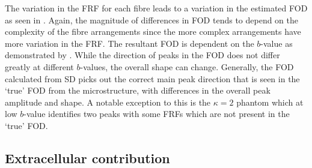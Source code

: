 The variation in the \ac{FRF} for each fibre leads to a variation in the estimated \ac{FOD} as seen in .
Again, the magnitude of differences in \ac{FOD} tends to depend on the complexity of the fibre arrangements since the more complex arrangements have more variation in the \ac{FRF}.
The resultant \ac{FOD} is dependent on the $b$-value as demonstrated by . While the direction of peaks in the \ac{FOD} does not differ greatly at different $b$-values, the overall shape can change. 
Generally, the \ac{FOD} calculated from \ac{SD} picks out the correct main peak direction that is seen in the `true' \ac{FOD} from the microstructure, with differences in the overall peak amplitude and shape.
A notable exception to this is the $\kappa=2$ phantom which at low $b$-value identifies two peaks with some \acp{FRF} which are not present in the `true' \ac{FOD}.

\subsection{Extracellular contribution}
\label{sec:frf_res_extracellular}


